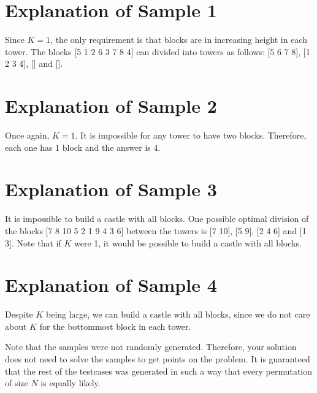 \section*{Explanation of Sample 1}
Since $K=1$, the only requirement is that blocks are in increasing height in each tower.
The blocks [5 1 2 6 3 7 8 4] can divided into towers as follows: [5 6 7 8], [1 2 3 4], [] and [].

\section*{Explanation of Sample 2}
Once again, $K=1$. It is impossible for any tower to have two blocks. Therefore, each one has 1 block and the answer is
4.

\section*{Explanation of Sample 3}
It is impossible to build a castle with all blocks. One possible optimal division of the blocks [7 8 10 5 2 1 9 4 3 6]
between the towers is [7 10], [5 9], [2 4 6] and [1 3]. Note that if $K$ were 1, it would be possible to build a castle
with all blocks.

\section*{Explanation of Sample 4}
Despite $K$ being large, we can build a castle with all blocks, since we do not care about $K$ for the bottommost block
in each tower.

Note that the samples were not randomly generated. Therefore, your solution does not need to solve the samples to get points
on the problem. It is guaranteed that the rest of the testcases was generated in such a way that every permutation of size
$N$ is equally likely.
